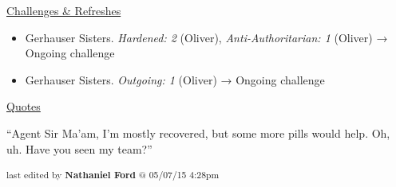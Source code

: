 \underline{  {\LARGE Challenges \& Refreshes }  }



\begin{itemize}
\item Gerhauser Sisters. \textit{Hardened: 2} (Oliver), \textit{Anti-Authoritarian: 1} (Oliver) → Ongoing challenge
\item Gerhauser Sisters. \textit{Outgoing: 1} (Oliver) → Ongoing challenge
\end{itemize}



\underline{  {\LARGE Quotes }  }



``Agent Sir Ma'am, I'm mostly recovered, but some more pills would help.  Oh, uh. Have you seen my team?''



\vspace{\fill}

\begin{flushright}
\textsubscript{last edited by \textbf{Nathaniel Ford} @ 05/07/15 4:28pm}
\end{flushright}

